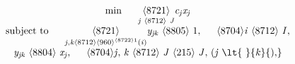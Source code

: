 \documentclass[crop,varwidth]{standalone}
\begin{document}
\begin{equation*}
{{\begin{matrix}
{\minormal{min}}{\hspace{0.33em}}{\hspace{0.33em}}{\hspace{0.33em}}{\hspace{0.33em}}{\hspace{0.33em}}{\mathop{\unicode{8721}}\limits\sb{{\miitalic{j}}{\hspace{0.33em}}{\mo{\unicode{8712}}}{\hspace{0.33em}}{\miitalic{J}}}}{{{\miitalic{c}}}\sb{{\miitalic{j}}}}{{{\miitalic{x}}}\sb{{\miitalic{j}}}}\\
{\minormal{subject}}{\hspace{0.33em}}{\minormal{to}}{\hspace{0.33em}}{\hspace{0.33em}}{\hspace{0.33em}}{\hspace{0.33em}}{\hspace{0.33em}}{\mathop{\unicode{8721}}\limits\sb{{\minormal{{}}{\miitalic{j}}{\minormal{,}}{\miitalic{k}}{\minormal{}}}{\mo{\unicode{8712}}}{\msup{{\mo{\unicode{960}}}}{{\mo{\unicode{8722}}}{1}}}{\minormal{(}}{\miitalic{i}}{\minormal{)}}}}{{{\miitalic{y}}}\sb{{\miitalic{jk}}}}{\hspace{0.33em}}\unicode{8805}{\hspace{0.33em}}{1}{\minormal{,}}{\hspace{0.33em}}{\hspace{0.33em}}{\hspace{0.33em}}{\hspace{0.33em}}{\hspace{0.33em}}\unicode{8704}{\miitalic{i}}{\hspace{0.33em}}\unicode{8712}{\hspace{0.33em}}{\miitalic{I}}{\minormal{,}}\\
{{{\miitalic{y}}}\sb{{\miitalic{jk}}}}{\hspace{0.33em}}\unicode{8804}{\hspace{0.33em}}{{{\miitalic{x}}}\sb{{\miitalic{j}}}}{\minormal{,}}{\hspace{0.33em}}{\hspace{0.33em}}{\hspace{0.33em}}{\hspace{0.33em}}{\hspace{0.33em}}\unicode{8704}{\minormal{{}}{\miitalic{j}}{\minormal{,}}{\hspace{0.33em}}{\miitalic{k}}{\minormal{}}}{\hspace{0.33em}}\unicode{8712}{\hspace{0.33em}}{\miitalic{J}}{\hspace{0.33em}}\unicode{215}{\hspace{0.33em}}{\miitalic{J}}{\minormal{,}}{\hspace{0.33em}}{\minormal{(}}{\miitalic{j}}{\hspace{0.33em}}\lt {\hspace{0.33em}}{\miitalic{k}}{\minormal{),}}\\

\end{matrix}}}
\end{equation*}
\end{document}
